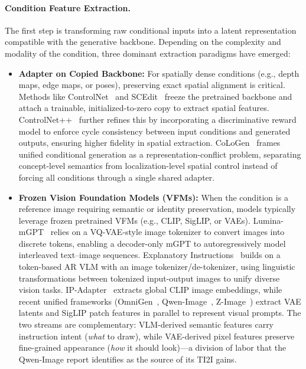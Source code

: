 \documentclass{llmxive}
\begin{document}
\paragraph{Condition Feature Extraction.}
The first step is transforming raw conditional inputs into a latent representation compatible with the generative backbone. Depending on the complexity and modality of the condition, three dominant extraction paradigms have emerged:
\begin{itemize}
    \item \textbf{Adapter on Copied Backbone:} For spatially dense conditions (e.g., depth maps, edge maps, or poses), preserving exact spatial alignment is critical. Methods like ControlNet~\citep{zhang2023controlnet} and SCEdit~\citep{jiang2024scedit} freeze the pretrained backbone and attach a trainable, initialized-to-zero copy to extract spatial features. ControlNet++~\citep{controlnet++} further refines this by incorporating a discriminative reward model to enforce cycle consistency between input conditions and generated outputs, ensuring higher fidelity in spatial extraction.
    CoLoGen~\citep{song2026cologen} frames unified conditional generation as a representation-conflict problem, separating concept-level semantics from localization-level spatial control instead of forcing all conditions through a single shared adapter.
    \item \textbf{Frozen Vision Foundation Models (VFMs):} When the condition is a reference image requiring semantic or identity preservation, models typically leverage frozen pretrained VFMs (e.g., CLIP, SigLIP, or VAEs). 
    Lumina-mGPT~\citep{liu2024luminamgpt} relies on a VQ-VAE-style image tokenizer to convert images into discrete tokens, enabling a decoder-only mGPT to autoregressively model interleaved text--image sequences.
    Explanatory Instructions~\citep{shen2024explanatory} builds on a token-based AR VLM with an image tokenizer/de-tokenizer, using linguistic transformations between tokenized input-output images to unify diverse vision tasks.
    IP-Adapter~\citep{ye2023ip} extracts global CLIP image embeddings, while recent unified frameworks (OmniGen~\citep{wu2025omnigen2}, Qwen-Image~\citep{wu2025qwen}, Z-Image~\citep{cai2025z}) extract VAE latents and SigLIP patch features in parallel to represent visual prompts. The two streams are complementary: VLM-derived semantic features carry instruction intent (\emph{what} to draw), while VAE-derived pixel features preserve fine-grained appearance (\emph{how} it should look)---a division of labor that the Qwen-Image report identifies as the source of its TI2I gains.

\end{itemize}
\end{document}
